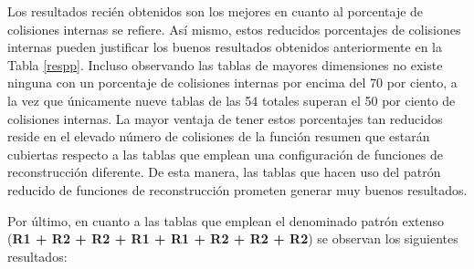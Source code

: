 \documentclass[12pt,spanish,listoffigures,listoftables,listofalgorithms]{tfgetsinf}
\begin{document}
Los resultados recién obtenidos son los mejores en cuanto al porcentaje de colisiones internas se refiere. Así mismo, estos reducidos porcentajes de colisiones internas pueden justificar los buenos resultados obtenidos anteriormente en la Tabla \ref{respp}. Incluso observando las tablas de mayores dimensiones no existe ninguna con un porcentaje de colisiones internas por encima del 70 por ciento, a la vez que únicamente nueve tablas de las 54 totales superan el 50 por ciento de colisiones internas. La mayor ventaja de tener estos porcentajes tan reducidos reside en el elevado número de colisiones de la función resumen que estarán cubiertas respecto a las tablas que emplean una configuración de funciones de reconstrucción diferente. De esta manera, las tablas que hacen uso del patrón reducido de funciones de reconstrucción prometen generar muy buenos resultados.

Por último, en cuanto a las tablas que emplean el denominado patrón extenso (\textbf{R1 + R2 + R2 + R1 + R1 + R2 + R2 + R2}) se observan los siguientes resultados:
\end{document}

